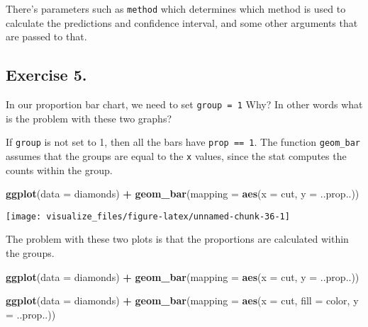 \documentclass[]{book}
\newenvironment{Shaded}{\begin{snugshade}}{\end{snugshade}}
\newcommand{\DataTypeTok}[1]{\textcolor[rgb]{0.13,0.29,0.53}{#1}}
\newcommand{\KeywordTok}[1]{\textcolor[rgb]{0.13,0.29,0.53}{\textbf{#1}}}
\newcommand{\NormalTok}[1]{#1}
\newcommand{\OperatorTok}[1]{\textcolor[rgb]{0.81,0.36,0.00}{\textbf{#1}}}
\newcommand{\StringTok}[1]{\textcolor[rgb]{0.31,0.60,0.02}{#1}}
\theoremstyle{definition}
\theoremstyle{definition}
\theoremstyle{definition}
\theoremstyle{remark}
\begin{document}
There's parameters such as \texttt{method} which determines which method
is used to calculate the predictions and confidence interval, and some
other arguments that are passed to that.

\hypertarget{exercise-5.-4}{%
\subsection{Exercise 5.}\label{exercise-5.-4}}

In our proportion bar chart, we need to set \texttt{group\ =\ 1} Why? In
other words what is the problem with these two graphs?

If \texttt{group} is not set to 1, then all the bars have
\texttt{prop\ ==\ 1}. The function \texttt{geom\_bar} assumes that the
groups are equal to the \texttt{x} values, since the stat computes the
counts within the group.

\begin{Shaded}
\begin{Highlighting}[]
\KeywordTok{ggplot}\NormalTok{(}\DataTypeTok{data =}\NormalTok{ diamonds) }\OperatorTok{+}\StringTok{ }
\StringTok{  }\KeywordTok{geom_bar}\NormalTok{(}\DataTypeTok{mapping =} \KeywordTok{aes}\NormalTok{(}\DataTypeTok{x =}\NormalTok{ cut, }\DataTypeTok{y =}\NormalTok{ ..prop..))}
\end{Highlighting}
\end{Shaded}

\begin{center}\texttt{[image: visualize\_files/figure-latex/unnamed-chunk-36-1]} \end{center}

The problem with these two plots is that the proportions are calculated
within the groups.

\begin{Shaded}
\begin{Highlighting}[]
\KeywordTok{ggplot}\NormalTok{(}\DataTypeTok{data =}\NormalTok{ diamonds) }\OperatorTok{+}\StringTok{ }
\StringTok{  }\KeywordTok{geom_bar}\NormalTok{(}\DataTypeTok{mapping =} \KeywordTok{aes}\NormalTok{(}\DataTypeTok{x =}\NormalTok{ cut, }\DataTypeTok{y =}\NormalTok{ ..prop..))}

\KeywordTok{ggplot}\NormalTok{(}\DataTypeTok{data =}\NormalTok{ diamonds) }\OperatorTok{+}\StringTok{ }
\StringTok{  }\KeywordTok{geom_bar}\NormalTok{(}\DataTypeTok{mapping =} \KeywordTok{aes}\NormalTok{(}\DataTypeTok{x =}\NormalTok{ cut, }\DataTypeTok{fill =}\NormalTok{ color, }\DataTypeTok{y =}\NormalTok{ ..prop..))}
\end{Highlighting}
\end{Shaded}
\end{document}
